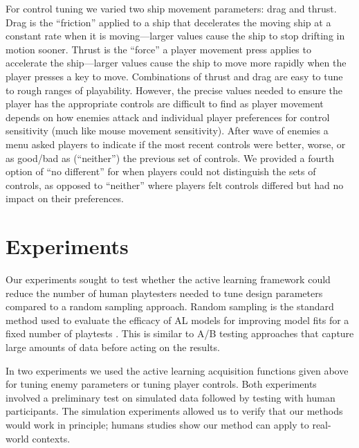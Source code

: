 \documentclass{sig-alternate}
\begin{document}
For control tuning we varied two
ship movement parameters: drag and thrust. 
Drag is the ``friction'' applied to a ship that decelerates the moving ship at a constant rate when it is moving---larger values cause the ship to stop drifting in motion sooner. 
Thrust is the ``force'' a player movement press applies to accelerate the ship---larger values cause the ship to move more rapidly when the player presses a key to move. 
%
Combinations of thrust and drag are easy to tune to rough ranges of playability.
However, the precise values needed to ensure the player has the appropriate controls are difficult to find as player movement depends on how enemies attack and individual player preferences for control sensitivity (much like mouse movement sensitivity). 
After wave of enemies a menu asked players to indicate if the most recent controls were better, worse, or as good/bad as (``neither'') the previous set of controls.
We provided a fourth option of ``no different'' for when players could not distinguish the sets of controls, as opposed to ``neither'' where players felt controls differed but had no impact on their preferences.








\section{Experiments}
Our experiments sought to test whether the active learning framework could reduce the number of human playtesters needed to tune design parameters compared to a random sampling approach.
Random sampling is the standard method used to evaluate the efficacy of AL models for improving model fits for a fixed number of playtests \cite{settles2012:al-book}. This is similar to A/B testing approaches that capture large amounts of data before acting on the results.

In two experiments we used the active learning acquisition functions given above for tuning enemy parameters or tuning player controls.
Both experiments involved a preliminary test on simulated data followed by testing with human participants.
The simulation experiments allowed us to verify that our methods would work in principle; humans studies show our method can apply to real-world contexts.
\end{document}
